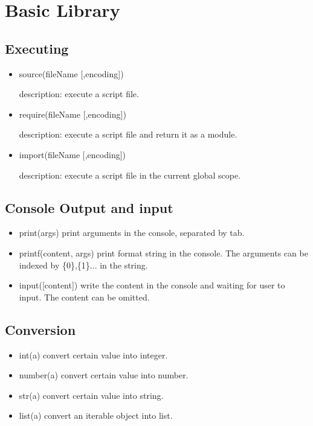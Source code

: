\documentclass[]{article}
\begin{document}
\section{Basic Library}
\subsection{Executing}
\begin{itemize}
	\item source(fileName [,encoding])

	description: execute a script file.

	\item require(fileName [,encoding])
	
	description: execute a script file and return it as a module.

	\item import(fileName [,encoding])

	description: execute a script file in the current global scope.
\end{itemize}

\subsection{Console Output and input}

\begin{itemize}
	\item print(args) print arguments in the console, separated by tab.

	\item printf(content, args) print format string in the console. The arguments can be indexed by \{0\},\{1\}... in the string.

	\item input([content]) write the content in the console and waiting for user to input. The content can be omitted.
\end{itemize}


\subsection{Conversion}
\begin{itemize}
	\item int(a) convert certain value into integer.

	\item number(a) convert certain value into number.

	\item str(a) convert certain value into string.

	\item list(a) convert an iterable object into list.

\end{itemize}
\end{document}
